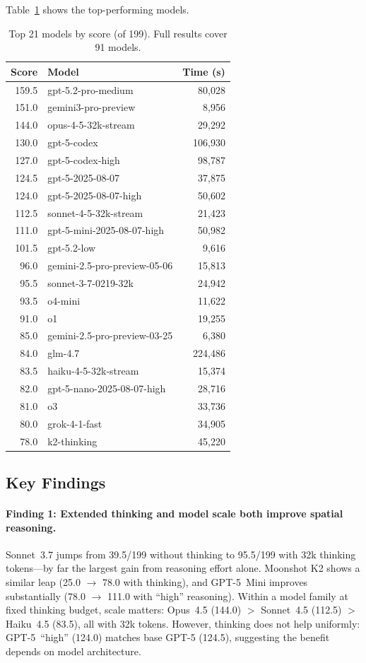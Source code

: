 \documentclass{article}
\begin{document}
Table~\ref{tab:leaderboard} shows the top-performing models.

\begin{table}[h]
\centering
\caption{Top 21 models by score (of 199). Full results cover 91 models.}
\label{tab:leaderboard}
\small
\begin{tabular}{@{}rlr@{}}
\toprule
Score & Model & Time (s) \\
\midrule
159.5 & gpt-5.2-pro-medium & 80{,}028 \\
151.0 & gemini3-pro-preview & 8{,}956 \\
144.0 & opus-4-5-32k-stream & 29{,}292 \\
130.0 & gpt-5-codex & 106{,}930 \\
127.0 & gpt-5-codex-high & 98{,}787 \\
124.5 & gpt-5-2025-08-07 & 37{,}875 \\
124.0 & gpt-5-2025-08-07-high & 50{,}602 \\
112.5 & sonnet-4-5-32k-stream & 21{,}423 \\
111.0 & gpt-5-mini-2025-08-07-high & 50{,}982 \\
101.5 & gpt-5.2-low & 9{,}616 \\
96.0 & gemini-2.5-pro-preview-05-06 & 15{,}813 \\
95.5 & sonnet-3-7-0219-32k & 24{,}942 \\
93.5 & o4-mini & 11{,}622 \\
91.0 & o1 & 19{,}255 \\
85.0 & gemini-2.5-pro-preview-03-25 & 6{,}380 \\
84.0 & glm-4.7 & 224{,}486 \\
83.5 & haiku-4-5-32k-stream & 15{,}374 \\
82.0 & gpt-5-nano-2025-08-07-high & 28{,}716 \\
81.0 & o3 & 33{,}736 \\
80.0 & grok-4-1-fast & 34{,}905 \\
78.0 & k2-thinking & 45{,}220 \\
\bottomrule
\end{tabular}
\end{table}

\subsection{Key Findings}

\paragraph{Finding 1: Extended thinking and model scale both improve spatial reasoning.}
Sonnet~3.7 jumps from 39.5/199 without thinking to 95.5/199 with 32k thinking tokens---by far the largest gain from reasoning effort alone. Moonshot K2 shows a similar leap (25.0 $\to$ 78.0 with thinking), and GPT-5~Mini improves substantially (78.0 $\to$ 111.0 with ``high'' reasoning). Within a model family at fixed thinking budget, scale matters: Opus~4.5 (144.0) $>$ Sonnet~4.5 (112.5) $>$ Haiku~4.5 (83.5), all with 32k tokens. However, thinking does not help uniformly: GPT-5~``high'' (124.0) matches base GPT-5 (124.5), suggesting the benefit depends on model architecture.
\end{document}
